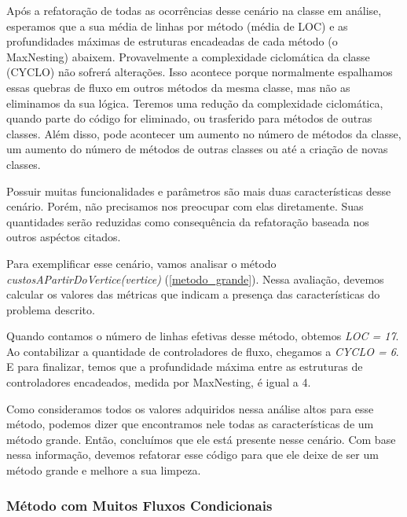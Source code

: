 	Após a refatoração de todas as ocorrências desse cenário na classe em análise, esperamos que a sua média de linhas por método (média de LOC) e as profundidades máximas de estruturas encadeadas de cada método (o MaxNesting) abaixem. Provavelmente a complexidade ciclomática da classe (CYCLO) não sofrerá alterações. Isso acontece porque normalmente espalhamos essas quebras de fluxo em outros métodos da mesma classe, mas não as eliminamos da sua lógica. Teremos uma redução da complexidade ciclomática, quando parte do código for eliminado, ou trasferido para métodos de outras classes. Além disso, pode acontecer um aumento no número de métodos da classe, um aumento do número de métodos de outras classes ou até a criação de novas classes.
	
	Possuir muitas funcionalidades e parâmetros são mais duas características desse cenário. Porém, não precisamos nos preocupar com elas diretamente. Suas quantidades serão reduzidas como consequência da refatoração baseada nos outros aspéctos citados.

   	Para exemplificar esse cenário, vamos analisar o método \textit{custosAPartirDoVertice(vertice)} (\ref{metodo_grande}). Nessa avaliação, devemos calcular os valores das métricas que indicam a presença das características do problema descrito. 
    
                                      
          
	Quando contamos o número de linhas efetivas desse método, obtemos \textit{LOC = 17}. Ao contabilizar a quantidade de controladores de fluxo, chegamos a \textit{CYCLO = 6}. E para finalizar, temos que a profundidade máxima entre as estruturas de controladores encadeados, medida por MaxNesting, é igual a 4. 
	
	Como consideramos todos os valores adquiridos nessa análise altos para esse método, podemos dizer que encontramos nele todas as características de um método grande. Então, concluímos que ele está presente nesse cenário. Com base nessa informação, devemos refatorar esse código para que ele deixe de ser um método grande e melhore a sua limpeza.
	
	
\subsubsection{Método com Muitos Fluxos Condicionais}

